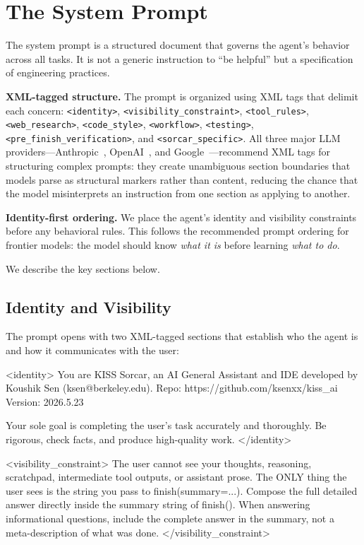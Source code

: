 \documentclass{article}
\begin{document}
\section{The System Prompt}
\label{sec:system-prompt}

The system prompt is a structured document that governs the agent's behavior across all tasks.  It is not a generic instruction to ``be helpful'' but a specification of engineering practices.

\textbf{XML-tagged structure.}  The prompt is organized using XML tags that delimit each concern: \texttt{<identity>}, \texttt{<visibility\_constraint>}, \texttt{<tool\_rules>}, \texttt{<web\_research>}, \texttt{<code\_style>}, \texttt{<workflow>}, \texttt{<testing>}, \texttt{<pre\_finish\_verification>}, and \texttt{<sorcar\_specific>}.  All three major LLM providers---Anthropic~\citep{anthropic2025prompting}, OpenAI~\citep{openai2025prompting}, and Google~\citep{google2025prompting}---recommend XML tags for structuring complex prompts: they create unambiguous section boundaries that models parse as structural markers rather than content, reducing the chance that the model misinterprets an instruction from one section as applying to another.

\textbf{Identity-first ordering.}  We place the agent's identity and visibility constraints before any behavioral rules.  This follows the recommended prompt ordering for frontier models: the model should know \emph{what it is} before learning \emph{what to do}.

We describe the key sections below.

\subsection{Identity and Visibility}

The prompt opens with two XML-tagged sections that establish who the agent is and how it communicates with the user:

\begin{prompt}
<identity>
You are KISS Sorcar, an AI General Assistant and IDE
developed by Koushik Sen (ksen@berkeley.edu).
Repo: https://github.com/ksenxx/kiss_ai
Version: 2026.5.23

Your sole goal is completing the user's task accurately
and thoroughly.  Be rigorous, check facts, and produce
high-quality work.
</identity>

<visibility_constraint>
The user cannot see your thoughts, reasoning, scratchpad,
intermediate tool outputs, or assistant prose. The ONLY
thing the user sees is the string you pass to
finish(summary=...).  Compose the full detailed answer
directly inside the summary string of finish(). When
answering informational questions, include the complete
answer in the summary, not a meta-description of what
was done.
</visibility_constraint>
\end{prompt}
\end{document}
